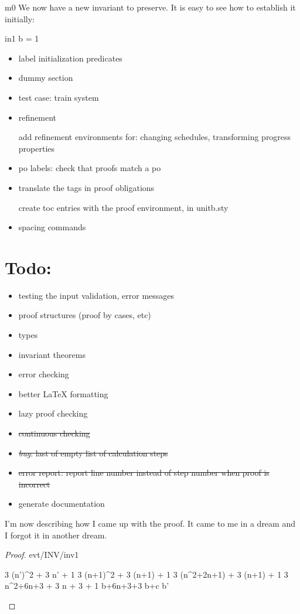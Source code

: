 \documentclass[12pt]{amsart}
\begin{document}
\begin{machine}{m0}
We now have a new invariant to preserve. It is easy to see how to establish it initially:
%
\begin{initialization}{in1}
	b = 1
\end{initialization}

\begin{itemize}
\item label initialization predicates
\item dummy section
\item test case: train system
\item refinement

	add refinement environments for: changing schedules, transforming progress properties
\item po labels: check that proofs match a po
\item translate the tags in proof obligations
	
	create toc entries with the proof environment, in unitb.sty
\item spacing commands
\end{itemize}

\section{Todo:}
\begin{itemize}
\item testing the input validation, error messages
\item proof structures (proof by cases, etc)
\item types
\item invariant theorems
\item error checking
\item better LaTeX formatting
\item lazy proof checking
\item \sout{continuous checking}
\item \sout{\emph{bug}: last of empty list of calculation steps}
\item \sout{error report: report line number instead of step number when proof is incorrect}
\item generate documentation
\end{itemize}

I'm now describing how I came up with the proof. It came to me in a dream and I forgot it in another dream.

\begin{proof}{evt/INV/inv1}
	\begin{calculation}
		3 \cdot (n')^2 + 3 \cdot n' + 1
	\hint{=}{ \ref{a0} }
		3 \cdot (n+1)^2 + 3 \cdot (n+1) + 1
		3 \cdot (n^2+2\cdot n+1) + 3 \cdot (n+1) + 1
		3 \cdot n^2+6\cdot n+3 + 3 \cdot n + 3 + 1
	\hint{=}{ \ref{inv1} }
		b+6\cdot n+3+3
		b+c
		b'
	\end{calculation}
\end{proof}


\end{machine}
\end{document}
